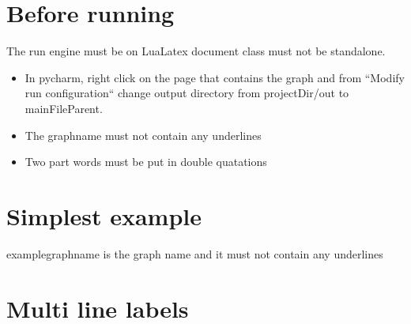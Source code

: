 \documentclass[a4paper]{article}
\title{}
\date{}
\begin{document}
    \maketitle
    \section{Before running}
          The run engine must be on LuaLatex document class must not be standalone.
        
        \begin{itemize}
            \item In pycharm, right click on the page that contains the graph and from ``Modify run configuration`` change output directory from {{projectDir}/out} to {mainFileParent}.
            \item The graphname must not contain any underlines
            \item Two part words must be put in double quatations
        \end{itemize}
    \section{Simplest example}
        examplegraphname is the graph name and it must not contain any underlines
    
    \section{Multi line labels}
\end{document}
